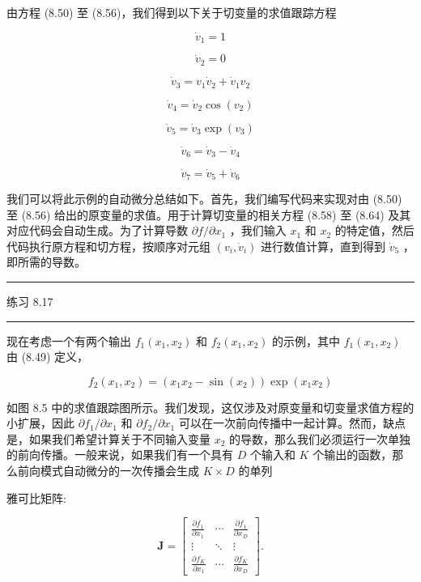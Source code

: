 \documentclass[10pt]{article}
\newcommand{\HRule}{\begin{center}\rule{0.9\linewidth}{0.2mm}\end{center}}
\begin{document}
由方程 (8.50) 至 (8.56)，我们得到以下关于切变量的求值跟踪方程

\[
{\dot{v}}_{1} = 1 \tag{8.58}
\]

\[
{\dot{v}}_{2} = 0 \tag{8.59}
\]

\[
{\dot{v}}_{3} = {v}_{1}{\dot{v}}_{2} + {\dot{v}}_{1}{v}_{2} \tag{8.60}
\]

\[
{\dot{v}}_{4} = {\dot{v}}_{2}\cos \left( {v}_{2}\right)  \tag{8.61}
\]

\[
{\dot{v}}_{5} = {\dot{v}}_{3}\exp \left( {v}_{3}\right)  \tag{8.62}
\]

\[
{\dot{v}}_{6} = {\dot{v}}_{3} - {\dot{v}}_{4} \tag{8.63}
\]

\[
{\dot{v}}_{7} = {\dot{v}}_{5} + {\dot{v}}_{6} \tag{8.64}
\]

我们可以将此示例的自动微分总结如下。首先，我们编写代码来实现对由 (8.50) 至 (8.56) 给出的原变量的求值。用于计算切变量的相关方程 (8.58) 至 (8.64) 及其对应代码会自动生成。为了计算导数 \(\partial f/\partial {x}_{1}\) ，我们输入 \({x}_{1}\) 和 \({x}_{2}\) 的特定值，然后代码执行原方程和切方程，按顺序对元组 \(\left( {{v}_{i},{\dot{v}}_{i}}\right)\) 进行数值计算，直到得到 \({\dot{v}}_{5}\) ，即所需的导数。

\HRule

练习 8.17

\HRule

现在考虑一个有两个输出 \({f}_{1}\left( {{x}_{1},{x}_{2}}\right)\) 和 \({f}_{2}\left( {{x}_{1},{x}_{2}}\right)\) 的示例，其中 \({f}_{1}\left( {{x}_{1},{x}_{2}}\right)\) 由 (8.49) 定义，

\[
{f}_{2}\left( {{x}_{1},{x}_{2}}\right)  = \left( {{x}_{1}{x}_{2} - \sin \left( {x}_{2}\right) }\right) \exp \left( {{x}_{1}{x}_{2}}\right)  \tag{8.65}
\]

如图 8.5 中的求值跟踪图所示。我们发现，这仅涉及对原变量和切变量求值方程的小扩展，因此 \(\partial {f}_{1}/\partial {x}_{1}\) 和 \(\partial {f}_{2}/\partial {x}_{1}\) 可以在一次前向传播中一起计算。然而，缺点是，如果我们希望计算关于不同输入变量 \({x}_{2}\) 的导数，那么我们必须运行一次单独的前向传播。一般来说，如果我们有一个具有 \(D\) 个输入和 \(K\) 个输出的函数，那么前向模式自动微分的一次传播会生成 \(K \times  D\) 的单列

雅可比矩阵:

\[
\mathbf{J} = \left\lbrack  \begin{matrix} \frac{\partial {f}_{1}}{\partial {x}_{1}} & \cdots & \frac{\partial {f}_{1}}{\partial {x}_{D}} \\  \vdots &  \ddots  & \vdots \\  \frac{\partial {f}_{K}}{\partial {x}_{1}} & \cdots & \frac{\partial {f}_{K}}{\partial {x}_{D}} \end{matrix}\right\rbrack  . \tag{8.66}
\]
\end{document}
